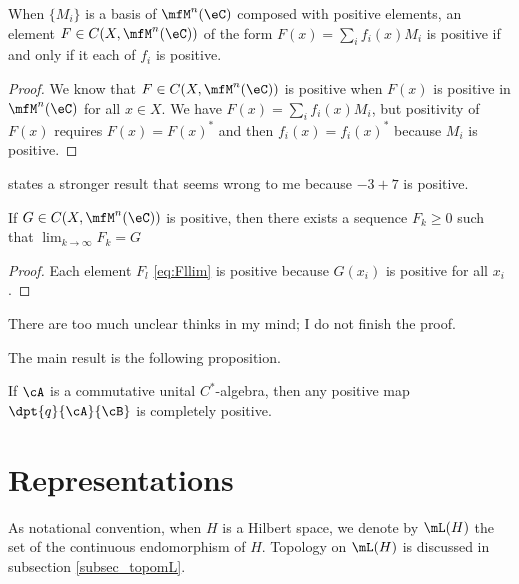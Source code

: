 \begin{proposition}
When $\{ M_i \}$ is a basis of $\mfM^n(\eC)$ composed with positive elements, an element $F\in C(X,\mfM^n(\eC))$ of the form $F(x)=\sum_if_i(x)M_i$ is positive if and only if it each of $f_i$ is positive.
\end{proposition}

\begin{proof}
We know that $F\in C(X,\mfM^n(\eC))$ is positive when $F(x)$ is positive in $\mfM^n(\eC)$ for all $x\in X$. We have $F(x)=\sum_if_i(x)M_i$, but positivity of $F(x)$ requires $F(x)=F(x)^*$ and then $f_i(x)=f_i(x)^*$ because $M_i$ is positive.

\end{proof}

\begin{probleme}
  \cite{Landsman} states a stronger result that seems wrong to me because \( -3+7\) is positive.
\end{probleme}

\begin{proposition}
If $G\in C(X,\mfM^n(\eC))$ is positive, then there exists a sequence $F_k\geq 0$ such that $\lim_{k\to\infty}F_k=G$
\end{proposition}

\begin{proof}
Each element $F_l$ \eqref{eq:Fllim} is positive because  $G(x_i)$ is positive for all $x_i$.
\end{proof}

\begin{probleme}
    There are too much unclear thinks in my mind; I do not finish the proof.
\end{probleme}

The main result is the following proposition.

\begin{proposition}
If $\cA$ is a commutative unital $C^*$-algebra, then any positive map $\dpt{ q }{ \cA }{ \cB }$ is completely positive.
\end{proposition}


\section{Representations}

As notational convention, when $H$ is a Hilbert space, we denote by $\mL(H)$ the set of the continuous endomorphism of $H$. Topology on $\mL(H)$ is discussed in subsection \ref{subsec_topomL}.

